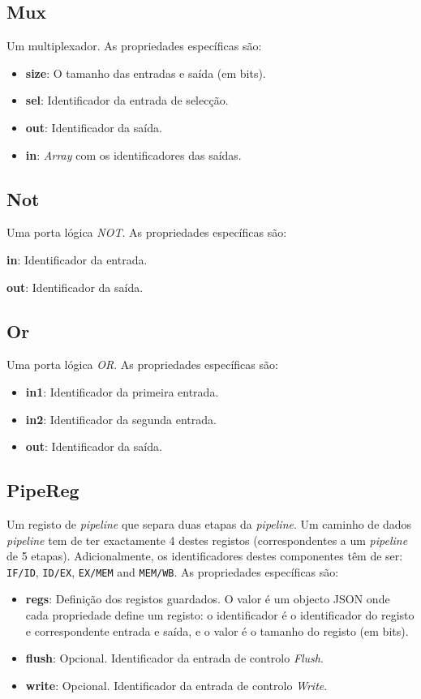 \documentclass[11pt,a4paper,twoside,titlepage]{report}
\begin{document}
\subsection{Mux}

Um multiplexador. As propriedades específicas são:
\begin{itemize}
	\item \textbf{size}: O tamanho das entradas e saída (em bits).
	\item \textbf{sel}: Identificador da entrada de selecção.
	\item \textbf{out}: Identificador da saída.
	\item \textbf{in}: \emph{Array} com os identificadores das saídas.
\end{itemize}

\subsection{Not}

Uma porta lógica \emph{NOT}. As propriedades específicas são:
\begin{itemize}

\end{itemize}
	\item \textbf{in}: Identificador da entrada.
	\item \textbf{out}: Identificador da saída.
\subsection{Or}

Uma porta lógica \emph{OR}. As propriedades específicas são:
\begin{itemize}
	\item \textbf{in1}: Identificador da primeira entrada.
	\item \textbf{in2}: Identificador da segunda entrada.
	\item \textbf{out}: Identificador da saída.
\end{itemize}

\subsection{PipeReg}

Um registo de \emph{pipeline} que separa duas etapas da \emph{pipeline}.
Um caminho de dados \emph{pipeline} tem de ter exactamente 4 destes registos
(correspondentes a um \emph{pipeline} de 5 etapas). Adicionalmente, os
identificadores destes componentes têm de ser:
\verb+IF/ID+, \verb+ID/EX+, \verb+EX/MEM+ and \verb+MEM/WB+.
As propriedades específicas são:
\begin{itemize}
	\item \textbf{regs}: Definição dos registos guardados. O valor é um objecto
		JSON onde cada propriedade define um registo: o identificador é o
		identificador do registo e correspondente entrada e saída, e o valor é o
		tamanho do registo (em bits).
	\item \textbf{flush}: Opcional. Identificador da entrada de controlo \emph{Flush}.
	\item \textbf{write}: Opcional. Identificador da entrada de controlo \emph{Write}.
\end{itemize}
\end{document}
